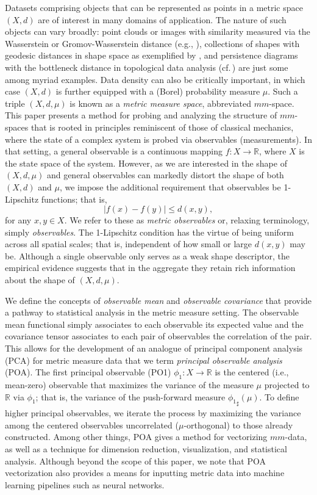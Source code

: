 \documentclass[11pt]{article}
\theoremstyle{definition}
\newcommand{\real}{\ensuremath{\mathbb{R}}}
\begin{document}
Datasets comprising objects that can be represented as points in a metric space $(X,d)$ are of interest in many domains of application. The nature of such objects can vary broadly: point clouds or images with similarity measured via the Wasserstein or Gromov-Wasserstein distance (e.g., \cite{earthmovers98,memoli2011}), collections of shapes with geodesic distances in shape space as exemplified by \cite{kendall1984,younes2000,mm2006,liu2010,charon2013}, and persistence diagrams with the bottleneck distance in topological data analysis (cf.\,\cite{carlsson2009,Chazal2016}) are just some among myriad examples. Data density can also be critically important, in which case $(X,d)$ is further equipped with a (Borel) probability measure $\mu$. Such a triple $(X,d, \mu)$ is known as a {\em metric measure space}, abbreviated $mm$-space. This paper presents a method for probing and analyzing the structure of $mm$-spaces that is rooted in principles reminiscent of those of classical mechanics, where the state of a complex system is probed via observables (measurements). In that setting, a general observable is a continuous mapping $f \colon X \to \real$, where $X$ is the state space of the system. However, as we are interested in the shape of $(X,d, \mu)$ and general observables can markedly distort the shape of both $(X,d)$ and $\mu$, we impose the additional requirement that observables be 1-Lipschitz functions; that is,
\begin{equation}
|f(x)-f(y)| \leq d(x,y),
\end{equation}
for any $x,y \in X$. We refer to these as {\em metric observables} or, relaxing terminology, simply {\em observables}. The 1-Lipschitz condition has the virtue of being uniform across all spatial scales; that is, independent of how small or large $d(x,y)$ may be. Although a single observable only serves as a weak shape descriptor, the empirical evidence suggests that in the aggregate they retain rich information about the shape of $(X,d,\mu)$.  

We define the concepts of {\em observable mean} and {\em observable covariance} that provide a pathway to statistical analysis in the metric measure setting. The observable mean functional simply associates to each observable its expected value and the covariance tensor associates to each pair of observables the correlation of the pair. This allows for the development of an analogue of principal component analysis (PCA) for metric measure data that we term {\em principal observable analysis} (POA). The first principal observable (PO1) $\phi_1 \colon X \to \real$ is the centered (i.e., mean-zero) observable that maximizes the variance of the measure $\mu$ projected to $\real$ via $\phi_1$; that is, the variance of the push-forward measure ${\phi_1}_\sharp (\mu)$.  To define higher principal observables, we iterate the process by maximizing the variance among the centered observables uncorrelated ($\mu$-orthogonal) to those already  constructed. Among other things, POA gives a method for vectorizing $mm$-data, as well as a technique for dimension reduction, visualization, and statistical analysis. Although beyond the scope of this paper, we note that POA vectorization also provides a means for inputting metric data into machine learning pipelines such as neural networks.
\end{document}
